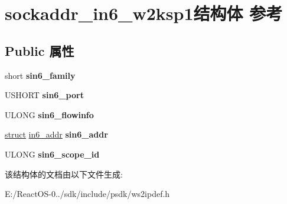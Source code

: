 \hypertarget{structsockaddr__in6__w2ksp1}{}\section{sockaddr\+\_\+in6\+\_\+w2ksp1结构体 参考}
\label{structsockaddr__in6__w2ksp1}
\subsection*{Public 属性}
\begin{DoxyCompactItemize}
\item 
\mbox{\label{structsockaddr__in6__w2ksp1_a053e585d07f9f0384c23cca4810ea704}} 
short {\bfseries sin6\+\_\+family}
\item 
\mbox{\label{structsockaddr__in6__w2ksp1_a5231bb5abf9732dd6a1349a3e1e9b921}} 
U\+S\+H\+O\+RT {\bfseries sin6\+\_\+port}
\item 
\mbox{\label{structsockaddr__in6__w2ksp1_af44bb70c8a6527e583f2c713f8c069b4}} 
U\+L\+O\+NG {\bfseries sin6\+\_\+flowinfo}
\item 
\mbox{\label{structsockaddr__in6__w2ksp1_aafdffc302d35a3c6a8a8892a45f29f9f}} 
\hyperlink{interfacestruct}{struct} \hyperlink{structin6__addr}{in6\+\_\+addr} {\bfseries sin6\+\_\+addr}
\item 
\mbox{\label{structsockaddr__in6__w2ksp1_a9a2ca42cd942770fb9bfe57995cfa579}} 
U\+L\+O\+NG {\bfseries sin6\+\_\+scope\+\_\+id}
\end{DoxyCompactItemize}


该结构体的文档由以下文件生成\+:\begin{DoxyCompactItemize}
\item 
E\+:/\+React\+O\+S-\/0../sdk/include/psdk/ws2ipdef.\+h\end{DoxyCompactItemize}
